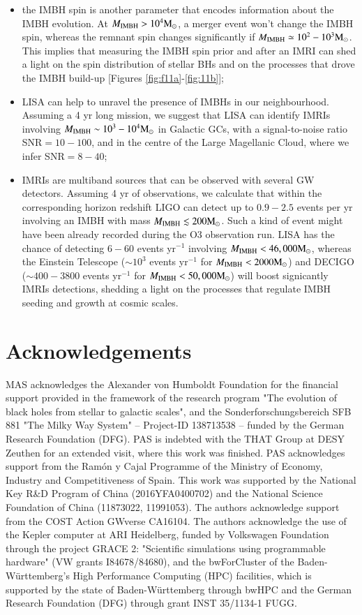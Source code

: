 \documentclass[article]{aa}
\newcommand{\Ms}{{\rm M}_\odot}
\newcommand{\ibh}{{\rm IMBH}}
\begin{document}
\begin{itemize}
\item the IMBH spin is another parameter that encodes information about the IMBH evolution. At $M_\ibh>10^4\Ms$, a merger event won't change the IMBH spin, whereas the remnant spin changes significantly if $M_\ibh\simeq10^2-10^3\Ms$. This implies that measuring the IMBH spin prior and after an IMRI can shed a light on the spin distribution of stellar BHs and on the processes that drove the IMBH build-up [Figures \ref{fig:f11a}-\ref{fig:11b}];
\item LISA can help to unravel the presence of IMBHs in our neighbourhood. Assuming a 4 yr long mission, we suggest that LISA can identify IMRIs involving $M_\ibh \sim 10^3-10^4\Ms$ in Galactic GCs, with a signal-to-noise ratio SNR$=10-100$, and in the centre of the Large Magellanic Cloud, where we infer SNR$=8-40$;
\item IMRIs are multiband sources that can be observed with several GW detectors. Assuming 4 yr of observations, we calculate that within the corresponding horizon redshift LIGO can detect up to $0.9-2.5$ events per yr involving an IMBH with mass $M_\ibh \lesssim 200\Ms$. Such a kind of event might have been already recorded during the O3 observation run. LISA has the chance of detecting $6-60$ events yr$^{-1}$ involving $M_\ibh < 46,000\Ms$, whereas the Einstein Telescope ($\sim 10^3$ events yr$^{-1}$ for $M_\ibh < 2000\Ms$) and DECIGO ($\sim 400-3800$ events yr$^{-1}$ for $M_\ibh < 50,000\Ms$) will boost signicantly IMRIs detections, shedding a light on the processes that regulate IMBH seeding and growth at cosmic scales.
\end{itemize}


\clearpage

\section*{Acknowledgements}

MAS acknowledges the Alexander von Humboldt Foundation for the financial
support provided in the framework of the research program "The evolution of
black holes from stellar to galactic scales", and the Sonderforschungsbereich
SFB 881 "The Milky Way System"  -- Project-ID 138713538 -- funded by the German
Research Foundation (DFG).  PAS is indebted with the THAT Group at DESY Zeuthen
for an extended visit, where this work was finished. PAS acknowledges support
from the Ram{\'o}n y Cajal Programme of the Ministry of Economy, Industry and
Competitiveness of Spain.  This work was supported by the National Key R\&D
Program of China (2016YFA0400702) and the National Science Foundation of China
(11873022, 11991053).  The authors acknowledge support from the COST Action
GWverse CA16104. The authors acknowledge the use of the Kepler computer at ARI
Heidelberg, funded by Volkswagen Foundation through the project GRACE 2:
"Scientific simulations using programmable hardware" (VW grants I84678/84680),
and the bwForCluster of the Baden-W\"urttemberg's High Performance Computing
(HPC) facilities, which is supported by the state of Baden-Württemberg through
bwHPC and the German Research Foundation (DFG) through grant INST 35/1134-1
FUGG.


\newpage
\footnotesize{

}
\end{document}
